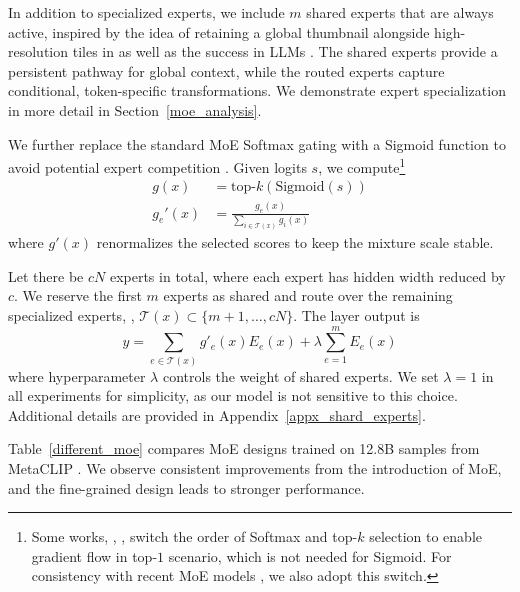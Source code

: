 \documentclass[runningheads]{llncs}
\begin{document}
In addition to specialized experts, we include $m$ shared experts that are always active, inspired by the idea of retaining a global thumbnail alongside high-resolution tiles in \cite{llava_next} as well as the success in LLMs \cite{deepseekmoe}. The shared experts provide a persistent pathway for global context, while the routed experts capture conditional, token-specific transformations. We demonstrate expert specialization in more detail in Section~\ref{moe_analysis}.

We further replace the standard MoE Softmax gating with a Sigmoid function to avoid potential expert competition \cite{sigmoid2,sigmoid3}. Given logits $s$, we compute\footnote{Some works, \eg, \cite{vmoe}, switch the order of Softmax and top-$k$ selection to enable gradient flow in top-$1$ scenario, which is not needed for Sigmoid. For consistency with recent MoE models \cite{deepseekv3,gshard}, we also adopt this switch.}
\begin{align}
    g(x) &= \text{top-}k(\mathrm{Sigmoid}(s))    \\
    g_e'(x) &= \frac{g_e(x)}{\sum_{i\in \mathcal{T}(x)} g_i(x)}
\end{align}
where $g'(x)$ renormalizes the selected scores to keep the mixture scale stable. 

Let there be $cN$ experts in total, where each expert has hidden width reduced by $c$. We reserve the first $m$ experts as shared and route over the remaining specialized experts, \ie, $\mathcal{T}(x)\subset\{m{+}1,\dots,cN\}$. The layer output is
\begin{equation}
    y = \sum_{e\in \mathcal{T}(x)}{g'_e(x)E_e(x)}+\lambda \sum_{e=1}^m{E_e(x)}
\end{equation}
where hyperparameter $\lambda$ controls the weight of shared experts. We set $\lambda=1$ in all experiments for simplicity, as our model is not sensitive to this choice. Additional details are provided in Appendix~\ref{appx_shard_experts}.

Table~\ref{different_moe} compares MoE designs trained on 12.8B samples from MetaCLIP \cite{metaclip}. We observe consistent improvements from the introduction of MoE, and the fine-grained design leads to stronger performance. 
\end{document}
